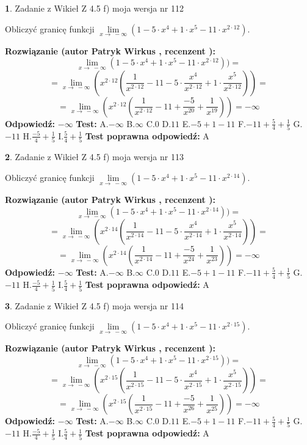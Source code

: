 \documentclass[12pt, a4paper]{article}
\theoremstyle{definition} %
\newtheorem{zad}{}
\newcommand{\zadStart}[1]{\begin{zad}#1\newline}
\newcommand{\zadStop}{\end{zad}}
\newcommand{\rozwStart}[2]{\noindent \textbf{Rozwiązanie (autor #1 , recenzent #2): }\newline}
\newcommand{\rozwStop}{\newline}
\newcommand{\odpStart}{\noindent \textbf{Odpowiedź:}\newline}
\newcommand{\odpStop}{\newline}
\newcommand{\testStart}{\noindent \textbf{Test:}\newline}
\newcommand{\testStop}{\newline}
\newcommand{\kluczStart}{\noindent \textbf{Test poprawna odpowiedź:}\newline}
\newcommand{\kluczStop}{\newline}
\begin{document}
\zadStart{Zadanie z Wikieł Z 4.5 f) moja wersja nr 112}



Obliczyć granicę funkcji  $\lim\limits_{x\to\ -\infty}(1 - 5 \cdot x^{4}+1 \cdot x^{5}- 11 \cdot x^{2\cdot12})$.
\zadStop
\rozwStart{Patryk Wirkus}{}
$$\lim\limits_{x\to\ -\infty}(1 - 5 \cdot x^{4}+1 \cdot x^{5}- 11 \cdot x^{2\cdot12}))=$$
$$=\lim\limits_{x\to\ -\infty}(x^{2\cdot12}(\frac{1}{x^{2\cdot12}}-11 -5 \cdot \frac{x^{4}}{x^{2\cdot12}}+1 \cdot \frac{x^{5}}{x^{2\cdot12}}))=$$
$$=\lim\limits_{x\to\ -\infty}(x^{2\cdot12}(\frac{1}{x^{2\cdot12}}-11 + \frac{-5}{x^{20}}+ \frac{1}{x^{19}}))=-\infty$$
\rozwStop
\odpStart
$-\infty$
\odpStop
\testStart
A.$-\infty$ B.$\infty$ C.$0$ D.$11$ E.$-5 + 1 - 11$
F.$-11+\frac{5}{4}+\frac{1}{5}$ G.$-11$
H.$\frac{-5}{4}+\frac{1}{5}$
I.$\frac{5}{4}+\frac{1}{5}$
\testStop
\kluczStart
A
\kluczStop



\zadStart{Zadanie z Wikieł Z 4.5 f) moja wersja nr 113}



Obliczyć granicę funkcji  $\lim\limits_{x\to\ -\infty}(1 - 5 \cdot x^{4}+1 \cdot x^{5}- 11 \cdot x^{2\cdot14})$.
\zadStop
\rozwStart{Patryk Wirkus}{}
$$\lim\limits_{x\to\ -\infty}(1 - 5 \cdot x^{4}+1 \cdot x^{5}- 11 \cdot x^{2\cdot14}))=$$
$$=\lim\limits_{x\to\ -\infty}(x^{2\cdot14}(\frac{1}{x^{2\cdot14}}-11 -5 \cdot \frac{x^{4}}{x^{2\cdot14}}+1 \cdot \frac{x^{5}}{x^{2\cdot14}}))=$$
$$=\lim\limits_{x\to\ -\infty}(x^{2\cdot14}(\frac{1}{x^{2\cdot14}}-11 + \frac{-5}{x^{24}}+ \frac{1}{x^{23}}))=-\infty$$
\rozwStop
\odpStart
$-\infty$
\odpStop
\testStart
A.$-\infty$ B.$\infty$ C.$0$ D.$11$ E.$-5 + 1 - 11$
F.$-11+\frac{5}{4}+\frac{1}{5}$ G.$-11$
H.$\frac{-5}{4}+\frac{1}{5}$
I.$\frac{5}{4}+\frac{1}{5}$
\testStop
\kluczStart
A
\kluczStop



\zadStart{Zadanie z Wikieł Z 4.5 f) moja wersja nr 114}



Obliczyć granicę funkcji  $\lim\limits_{x\to\ -\infty}(1 - 5 \cdot x^{4}+1 \cdot x^{5}- 11 \cdot x^{2\cdot15})$.
\zadStop
\rozwStart{Patryk Wirkus}{}
$$\lim\limits_{x\to\ -\infty}(1 - 5 \cdot x^{4}+1 \cdot x^{5}- 11 \cdot x^{2\cdot15}))=$$
$$=\lim\limits_{x\to\ -\infty}(x^{2\cdot15}(\frac{1}{x^{2\cdot15}}-11 -5 \cdot \frac{x^{4}}{x^{2\cdot15}}+1 \cdot \frac{x^{5}}{x^{2\cdot15}}))=$$
$$=\lim\limits_{x\to\ -\infty}(x^{2\cdot15}(\frac{1}{x^{2\cdot15}}-11 + \frac{-5}{x^{26}}+ \frac{1}{x^{25}}))=-\infty$$
\rozwStop
\odpStart
$-\infty$
\odpStop
\testStart
A.$-\infty$ B.$\infty$ C.$0$ D.$11$ E.$-5 + 1 - 11$
F.$-11+\frac{5}{4}+\frac{1}{5}$ G.$-11$
H.$\frac{-5}{4}+\frac{1}{5}$
I.$\frac{5}{4}+\frac{1}{5}$
\testStop
\kluczStart
A
\kluczStop
\end{document}
